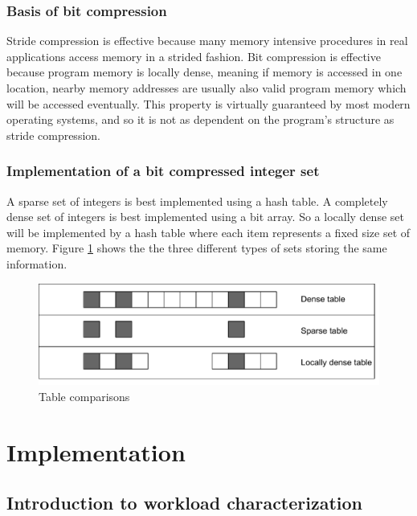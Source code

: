 \documentclass[12pt,twoside]{reedthesis}
\begin{document}
		\subsection{Basis of bit compression}
		
		Stride compression is effective because many memory intensive procedures in real applications access memory in a strided fashion. Bit compression is effective because program memory is locally dense, meaning if memory is accessed in one location, nearby memory addresses are usually also valid program memory which will be accessed eventually. This property is virtually guaranteed by most modern operating systems, and so it is not as dependent on the program's structure as stride compression. 
		
		\subsection{Implementation of a bit compressed integer set}	
		
		A sparse set of integers is best implemented using a hash table. A completely dense set of integers is best implemented using a bit array. So a locally dense set will be implemented by a hash table where each item represents a fixed size set of memory. Figure \ref{fig:bit-local-density} shows the the three different types of sets storing the same information. %
		
		
		\begin{figure}[H]
			\caption{Table comparisons}
			\label{fig:bit-local-density}
			\includegraphics[scale=0.8]{BitSetComparison.pdf}
		\end{figure}
		
		
		
\chapter{Implementation}

	\section{Introduction to workload characterization}
	
\end{document}

